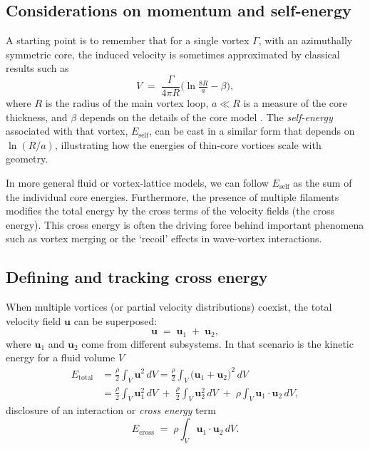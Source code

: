 \subsection{Considerations on momentum and self-energy}
\label{sec:momentum}
A starting point is to remember that for a single vortex $\Gamma$, with an
azimuthally symmetric core, the induced velocity is sometimes approximated by
classical results such as
\begin{equation}
   V \;=\; \frac{\Gamma}{4 \pi R}
   \bigl(\ln \tfrac{8 R}{a} - \beta \bigr),\label{eq:appendix:velocity}
\end{equation}
where $R$ is the radius of the main vortex loop, $a \ll R$ is a measure of the core thickness,
and $\beta$ depends on the details of the core model \cite{Saffman1992}. The
\emph{self-energy} associated with that vortex, $E_\text{self}$, can be cast in a
similar form that depends on $\ln(R/a)$, illustrating how the energies of thin-core vortices
scale with geometry.

In more general fluid or vortex-lattice models, we can follow $E_\text{self}$ as the
sum of the individual core energies. Furthermore, the presence of multiple filaments
modifies the total energy by the cross terms of the velocity fields (the cross energy). This
cross energy is often the driving force behind important phenomena such as vortex merging or the `recoil' effects
in wave-vortex interactions.

\subsection{Defining and tracking cross energy}
\label{sec:cross}
When multiple vortices (or partial velocity distributions) coexist, the total velocity field $\mathbf{u}$ can be superposed:
\begin{equation}
   \mathbf{u} \;=\; \mathbf{u}_1 \;+\;\mathbf{u}_2,\label{eq:appendix:superpose}
\end{equation}
where $\mathbf{u}_1$ and $\mathbf{u}_2$ come from different subsystems. In that
scenario is the kinetic energy for a fluid volume $V$
\begin{align}
   E_\text{total} &= \frac{\rho}{2} \int_V \mathbf{u}^2 \,dV
   = \frac{\rho}{2} \int_V \bigl(\mathbf{u}_1 + \mathbf{u}_2 \bigr)^2\, dV \\
   &= \frac{\rho}{2} \int_V \mathbf{u}_1^2 \,dV \;+\;\frac{\rho}{2} \int_V \mathbf{u}_2^2 \,dV
   \;+\;\rho \int_V \mathbf{u}_1 \cdot \mathbf{u}_2 \, dV,
\end{align}
disclosure of an interaction or \emph{cross energy} term
\begin{equation}
   E_\text{cross} \;=\; \rho \int_V \mathbf{u}_1 \cdot \mathbf{u}_2 \, dV.
   \label{eq:cross-term}
\end{equation}

